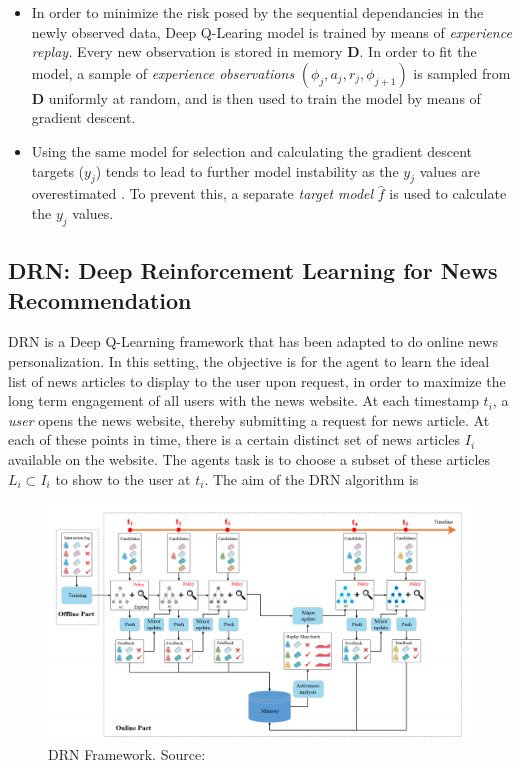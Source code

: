 \documentclass{mldsmsc}
\begin{document}
\begin{itemize}
    \item In order to minimize the risk posed by the sequential dependancies in the newly observed data, Deep Q-Learing
    model is trained by means of \emph{experience replay.} Every new observation is stored in memory $\mathbf{D}$. In order
    to fit the model, a sample of \emph{experience observations}  $(\phi_{j}, a_j, r_j, \phi_{j+1})$ is sampled from $\mathbf{D}$
    uniformly at random, and is then used to train the model by means of gradient descent.
    \item Using the same model for selection and calculating the gradient descent targets ($y_j$) tends to lead to further model instability as the $y_j$ values are overestimated \citep{RefWorks:mnih2015human-level}.
    To prevent this, a separate \emph{target model} $\hat{f}$ is used to calculate the $y_j$ values.
\end{itemize}

\subsection{DRN: Deep Reinforcement Learning for News Recommendation}

DRN \citep{RefWorks:zheng2018drn:} is a Deep Q-Learning framework 
that has been adapted to do online news personalization. In this setting, the objective is for the
agent to learn the ideal list of news articles to display to the user upon request, in order to maximize
the long term engagement of all users with the news website. At each timestamp $t_i$, a \emph{user}
opens the news website, thereby submitting a request for news article. At each of these points in time,
there is a certain distinct set of news articles $I_i$ available on the website. The agents task is to
choose a subset of these articles $L_i \subset I_i$ to show to the user at $t_i$. The aim of the DRN algorithm
is 


\begin{figure}[h]
    \centering
    \includegraphics[width=\textwidth]{../figures/drn.png}
    \caption{DRN Framework. Source: \citep{RefWorks:zheng2018drn:}}
    \label{fig:drn}
\end{figure}
\end{document}
